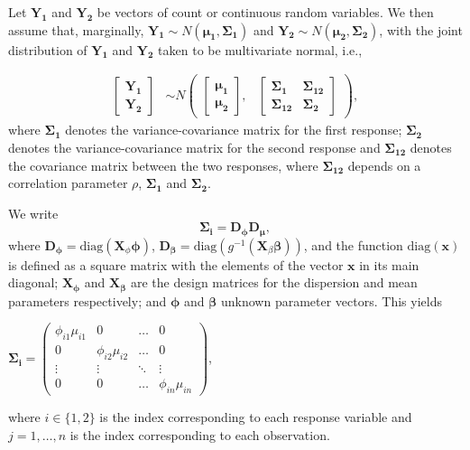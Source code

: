 \documentclass[useAMS,referee]{biom}
\begin{document}
Let $\mathbf{Y_1}$ and $\mathbf{Y_2}$ be vectors of count or continuous random variables. We then assume that, marginally, $\mathbf{Y_1} \sim N(\boldsymbol{\mu_1},\boldsymbol{\Sigma_1})$ and  $\mathbf{Y_2} \sim N(\boldsymbol{\mu_2},\boldsymbol{\Sigma_2})$, with the joint distribution of $\mathbf{Y_1}$ and $\mathbf{Y_2}$ taken to be multivariate normal, i.e.,

\begin{align}\label{eq1}
\begin{bmatrix}\mathbf{Y_1}\\
\mathbf{Y_2}
\end{bmatrix} &\sim  N
\begin{pmatrix}
\begin{bmatrix}
\boldsymbol{\mu_1}\\
\boldsymbol{\mu_2}
\end{bmatrix}\!\!,&
\begin{bmatrix}
\boldsymbol{\Sigma_1} & \boldsymbol{\Sigma_{12}} \\
\boldsymbol{\Sigma_{12}} & \boldsymbol{\Sigma_2}
\end{bmatrix}
\end{pmatrix},
\end{align}
where  $\boldsymbol{\Sigma_1}$ denotes the variance-covariance matrix for the first response; $\boldsymbol{\Sigma_2}$ denotes the variance-covariance matrix for the second response and $\boldsymbol{\Sigma_{12}}$
denotes the covariance matrix between the two responses, where $\boldsymbol{\Sigma_{12}}$ depends on a correlation parameter $\rho$, $\boldsymbol{\Sigma_1}$ and $\boldsymbol{\Sigma_2}$.

We write  $$\boldsymbol{\Sigma_i} = \mathbf{D_\phi}\mathbf{D_\mu},$$ where $\mathbf{D_\phi}=\mbox{diag}(\mathbf{X}_\phi \boldsymbol{\phi})$, $\mathbf{D_\beta}=\mbox{diag} (g^{-1}(\mathbf{X}_\beta \boldsymbol{\beta}))$, and the function $\mbox{diag}(\mathbf{x})$ is defined as a square matrix with the elements of the vector $\mathbf{x}$ in its main diagonal; $\mathbf{X_\phi}$ and $\mathbf{X_\beta}$ are the design  matrices for the dispersion and mean parameters respectively; and $\boldsymbol\phi$ and $\boldsymbol\beta$ unknown parameter vectors. This yields
\begin{center}
	$\boldsymbol{\Sigma_i} =
	\begin{pmatrix}
	\phi_{i1}\mu_{i1} & 0 & \dots & 0 \\
	0 & \phi_{i2}\mu_{i2} & \dots & 0 \\
	\vdots & \vdots & \ddots & \vdots \\
	0 & 0 & \dots & \phi_{in}\mu_{in}
	\end{pmatrix}
	$,
\end{center}
where $i\in\{1,2\}$ is the index corresponding to each response variable and $j=1,\ldots,n$ is the index corresponding to each observation.
\end{document}
